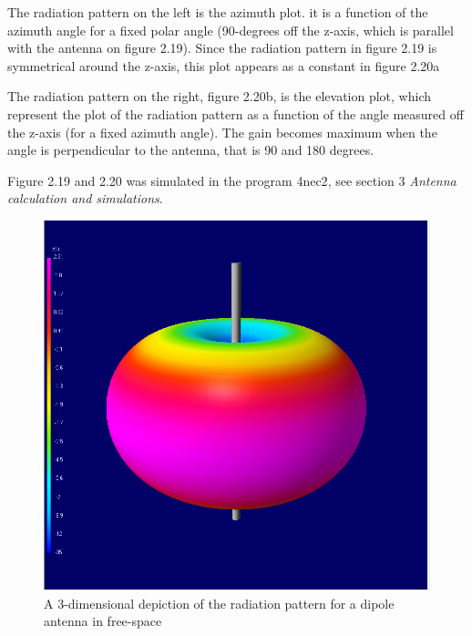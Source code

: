 The radiation pattern on the left is the azimuth plot. it is a function of the azimuth angle for a fixed polar angle (90-degrees off the z-axis, which is parallel with the antenna on figure 2.19). Since the radiation pattern in figure 2.19 is symmetrical around the z-axis, this plot appears as a constant in figure 2.20a

The radiation pattern on the right, figure 2.20b, is the elevation plot, which represent the plot of the radiation pattern as a function of the angle measured off the z-axis (for a fixed azimuth angle). The gain becomes maximum when the angle is perpendicular to the antenna, that is 90 and 180 degrees.

Figure 2.19 and 2.20 was simulated in the program 4nec2\cite{4nec2}, see section 3 \textit{Antenna calculation and simulations}. 

\begin{figure}[h]
\centering
\includegraphics[scale=0.5]{figures/DipoleAntennaRad.PNG}
\caption{A 3-dimensional depiction of the radiation pattern for a dipole antenna in free-space}
\end{figure}

